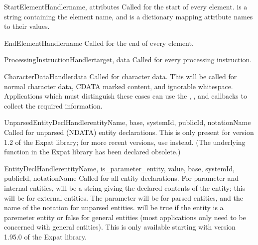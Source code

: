 \begin{methoddesc}[xmlparser]{StartElementHandler}{name, attributes}
Called for the start of every element.   is a string
containing the element name, and  is a dictionary
mapping attribute names to their values.
\end{methoddesc}

\begin{methoddesc}[xmlparser]{EndElementHandler}{name}
Called for the end of every element.
\end{methoddesc}

\begin{methoddesc}[xmlparser]{ProcessingInstructionHandler}{target, data}
Called for every processing instruction.
\end{methoddesc}

\begin{methoddesc}[xmlparser]{CharacterDataHandler}{data}
Called for character data.  This will be called for normal character
data, CDATA marked content, and ignorable whitespace.  Applications
which must distinguish these cases can use the
, ,
and  callbacks to collect the required
information.
\end{methoddesc}

\begin{methoddesc}[xmlparser]{UnparsedEntityDeclHandler}{entityName, base,
                                                         systemId, publicId,
                                                         notationName}
Called for unparsed (NDATA) entity declarations.  This is only present
for version 1.2 of the Expat library; for more recent versions, use
 instead.  (The underlying function in the
Expat library has been declared obsolete.)
\end{methoddesc}

\begin{methoddesc}[xmlparser]{EntityDeclHandler}{entityName,
                                                 is_parameter_entity, value,
                                                 base, systemId,
                                                 publicId,
                                                 notationName}
Called for all entity declarations.  For parameter and internal
entities,  will be a string giving the declared contents
of the entity; this will be  for external entities.  The
 parameter will be  for parsed entities,
and the name of the notation for unparsed entities.
 will be true if the entity is a paremeter
entity or false for general entities (most applications only need to
be concerned with general entities).
This is only available starting with version 1.95.0 of the Expat
library.
\end{methoddesc}

